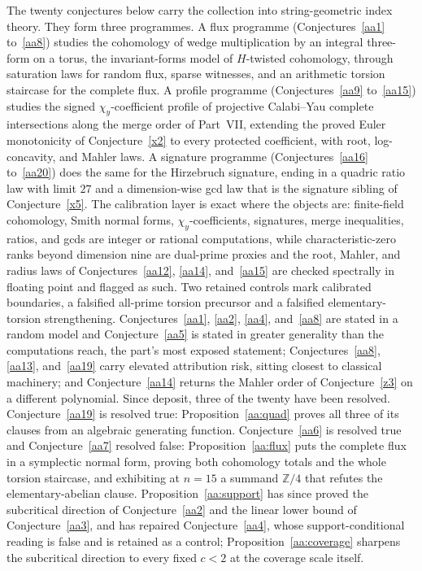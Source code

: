 \documentclass[11pt]{article}
\theoremstyle{definition}
\newcommand{\Z}{\mathbb Z}
\providecommand{\Z}{\mathbb Z}
\begin{document}
The twenty conjectures below carry the collection into string-geometric index theory.  They form three programmes.  A flux programme (Conjectures~\ref{aa1} to~\ref{aa8}) studies the cohomology of wedge multiplication by an integral three-form on a torus, the invariant-forms model of $H$-twisted cohomology, through saturation laws for random flux, sparse witnesses, and an arithmetic torsion staircase for the complete flux.  A profile programme (Conjectures~\ref{aa9} to~\ref{aa15}) studies the signed $\chi_y$-coefficient profile of projective Calabi--Yau complete intersections along the merge order of Part~VII, extending the proved Euler monotonicity of Conjecture~\ref{x2} to every protected coefficient, with root, log-concavity, and Mahler laws.  A signature programme (Conjectures~\ref{aa16} to~\ref{aa20}) does the same for the Hirzebruch signature, ending in a quadric ratio law with limit $27$ and a dimension-wise gcd law that is the signature sibling of Conjecture~\ref{x5}.  The calibration layer is exact where the objects are: finite-field cohomology, Smith normal forms, $\chi_y$-coefficients, signatures, merge inequalities, ratios, and gcds are integer or rational computations, while characteristic-zero ranks beyond dimension nine are dual-prime proxies and the root, Mahler, and radius laws of Conjectures~\ref{aa12}, \ref{aa14}, and~\ref{aa15} are checked spectrally in floating point and flagged as such.  Two retained controls mark calibrated boundaries, a falsified all-prime torsion precursor and a falsified elementary-torsion strengthening.  Conjectures~\ref{aa1}, \ref{aa2}, \ref{aa4}, and~\ref{aa8} are stated in a random model and Conjecture~\ref{aa5} is stated in greater generality than the computations reach, the part's most exposed statement; Conjectures~\ref{aa8}, \ref{aa13}, and~\ref{aa19} carry elevated attribution risk, sitting closest to classical machinery; and Conjecture~\ref{aa14} returns the Mahler order of Conjecture~\ref{z3} on a different polynomial.  Since deposit, three of the twenty have been resolved.  Conjecture~\ref{aa19} is resolved true: Proposition~\ref{aa:quad} proves all three of its clauses from an algebraic generating function.  Conjecture~\ref{aa6} is resolved true and Conjecture~\ref{aa7} resolved false: Proposition~\ref{aa:flux} puts the complete flux in a symplectic normal form, proving both cohomology totals and the whole torsion staircase, and exhibiting at $n=15$ a summand $\Z/4$ that refutes the elementary-abelian clause.  Proposition~\ref{aa:support} has since proved the subcritical direction of Conjecture~\ref{aa2} and the linear lower bound of Conjecture~\ref{aa3}, and has repaired Conjecture~\ref{aa4}, whose support-conditional reading is false and is retained as a control; Proposition~\ref{aa:coverage} sharpens the subcritical direction to every fixed $c<2$ at the coverage scale itself.
\end{document}
